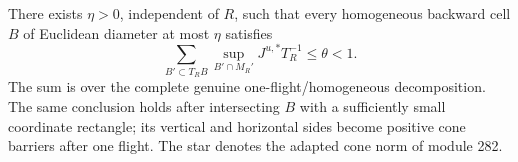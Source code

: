 \begin{lemma}
\label{lem:wp-small}
There exists $\eta>0$, independent of $R$, such that every homogeneous
backward cell $B$ of Euclidean diameter at most $\eta$ satisfies
\begin{equation}\label{eq:wp-cell-step}
 \sum_{B'\subset T_RB}
             \sup_{B'\cap M_R'}J^{u,*}T_R^{-1}\le\theta<1.
\end{equation}
The sum is over the complete genuine one-flight/homogeneous
decomposition.  The same conclusion holds after intersecting $B$
with a sufficiently small coordinate rectangle; its vertical and
horizontal sides become positive cone barriers after one flight.
The star denotes the adapted cone norm of module 282.
\end{lemma}

